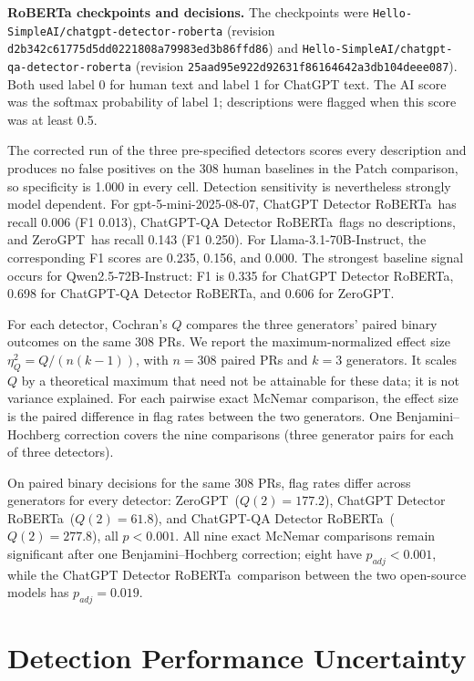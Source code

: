 \documentclass[11pt,a4paper]{article}
\newcommand{\proprietaryLLM}{gpt-5-mini-2025-08-07}
\newcommand{\openSourceLLMOne}{Llama-3.1-70B-Instruct}
\newcommand{\openSourceLLMTwo}{Qwen2.5-72B-Instruct}
\newcommand{\zeroGptDetector}{ZeroGPT}
\newcommand{\robertaDetector}{ChatGPT Detector RoBERTa}
\newcommand{\robertaQaDetector}{ChatGPT-QA Detector RoBERTa}
\begin{document}
{\raggedright
\textbf{RoBERTa checkpoints and decisions.}
The checkpoints were \nolinkurl{Hello-SimpleAI/chatgpt-detector-roberta} (revision \texttt{d2b342c6\allowbreak{}1775d5dd\allowbreak{}0221808a\allowbreak{}79983ed3\allowbreak{}b86ffd86}) and \nolinkurl{Hello-SimpleAI/chatgpt-qa-detector-roberta} (revision \texttt{25aad95e\allowbreak{}922d9263\allowbreak{}1f861646\allowbreak{}42a3db10\allowbreak{}4deee087}). Both used label 0 for human text and label 1 for ChatGPT text. The AI score was the softmax probability of label 1; descriptions were flagged when this score was at least 0.5.\par}


The corrected run of the three pre-specified detectors scores every description and produces no false positives on the 308
human baselines in the Patch comparison, so specificity is 1.000 in every cell. Detection
sensitivity is nevertheless strongly model dependent. For \proprietaryLLM,
\robertaDetector~has recall 0.006 (F1 0.013), \robertaQaDetector~flags no descriptions, and
\zeroGptDetector~has recall 0.143 (F1 0.250). For \openSourceLLMOne, the corresponding F1
scores are 0.235, 0.156, and 0.000. The strongest baseline signal occurs for
\openSourceLLMTwo: F1 is 0.335 for \robertaDetector, 0.698 for \robertaQaDetector, and 0.606
for \zeroGptDetector.

For each detector, Cochran's $Q$ compares the three generators' paired binary outcomes on the same 308 PRs. We report the maximum-normalized effect size $\eta^2_Q=Q/(n(k-1))$, with $n=308$ paired PRs and $k=3$ generators. It scales $Q$ by a theoretical maximum that need not be attainable for these data; it is not variance explained. For each pairwise exact McNemar comparison, the effect size is the paired difference in flag rates between the two generators. One Benjamini--Hochberg correction covers the nine comparisons (three generator pairs for each of three detectors).

On paired binary decisions for the same 308 PRs, flag rates differ across generators for every
detector: \zeroGptDetector~($Q(2)=177.2$), \robertaDetector~($Q(2)=61.8$), and
\robertaQaDetector~($Q(2)=277.8$), all $p<0.001$. All nine exact McNemar comparisons remain
significant after one Benjamini--Hochberg correction; eight have $p_{adj}<0.001$, while the
\robertaDetector~comparison between the two open-source models has $p_{adj}=0.019$.

\section{Detection Performance Uncertainty}
\end{document}
